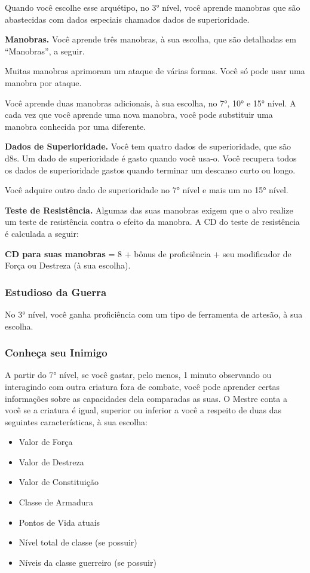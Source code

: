 \documentclass{RPG_Adventure}[2021/10/20]
\begin{document}
\begin{multicols}{2}
Quando você escolhe esse arquétipo, no 3° nível, você aprende manobras que são
abastecidas com dados especiais chamados dados de superioridade.

\textbf{Manobras.} Você aprende três manobras, à sua escolha, que são detalhadas
em ``Manobras'', a seguir.

Muitas manobras aprimoram um ataque de várias formas.  Você só pode usar uma
manobra por ataque.

Você aprende duas manobras adicionais, à sua escolha, no 7°, 10° e 15° nível. A
cada vez que você aprende uma nova manobra, você pode substituir uma manobra
conhecida por uma diferente.

\textbf{Dados de Superioridade.} Você tem quatro dados de superioridade, que são
d8s. Um dado de superioridade é gasto quando você usa-o. Você recupera todos os
dados de superioridade gastos quando terminar um descanso curto ou longo.

Você adquire outro dado de superioridade no 7° nível e mais um no 15° nível.

\textbf{Teste de Resistência.} Algumas das suas manobras exigem que o alvo
realize um teste de resistência contra o efeito da manobra. A CD do teste de
resistência é calculada a seguir:
\begin{center}
\textbf{CD para suas manobras} = 8 + bônus de proficiência + seu modificador de
Força ou Destreza (à sua escolha).
\end{center}

\subsubsection{Estudioso da Guerra}%

No 3° nível, você ganha proficiência com um tipo de ferramenta de artesão, à sua
escolha.

\subsubsection{Conheça seu Inimigo}%

A partir do 7° nível, se você gastar, pelo menos, 1 minuto observando ou
interagindo com outra criatura fora de combate, você pode aprender certas
informações sobre as capacidades dela comparadas as suas. O Mestre conta a você
se a criatura é igual, superior ou inferior a você a respeito de duas das
seguintes características, à sua escolha:

\begin{itemize}
    \item Valor de Força
    \item Valor de Destreza
    \item Valor de Constituição
    \item Classe de Armadura
    \item Pontos de Vida atuais
    \item Nível total de classe (se possuir)
    \item Níveis da classe guerreiro (se possuir)
\end{itemize}


\end{multicols}
\end{document}
